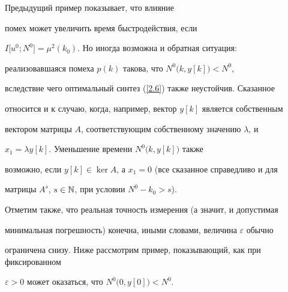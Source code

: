 \begin{notes}


Предыдущий пример показывает, что влияние


помех может увеличить время быстродействия, если


$I\bigl[u^0; N^0\bigr]=\mu^2(k_0)$. Но иногда возможна и обратная ситуация:


реализовавшаяся помеха $p(k)$ такова, что $N^0\bigl(k, y[k]\bigr)<N^0$,


вследствие чего оптимальный синтез (\ref{2.6}) также неустойчив. Сказанное


относится и к случаю, когда, например, вектор $y[k]$ является собственным


вектором матрицы $A$, соответствующим собственному значению $\lambda$, и


$x_1=\lambda y[k]$. Уменьшение времени $N^0\bigl(k, y[k]\bigr)$ также


возможно, если $y[k]\in\ker A$, а $x_1=0$ (все сказанное справедливо и для


матрицы $A^s$, $s\in\Bbb{N}$, при условии $N^0-k_0>s$).


\end{notes}





Отметим также, что реальная точность измерения (а значит, и допустимая


минимальная погрешность) конечна, иными словами, величина $\varepsilon$ обычно


ограничена снизу. Ниже рассмотрим пример, показывающий, как при фиксированном


$\varepsilon>0$ может оказаться, что $N^0\bigl(0, y[0]\bigr)<N^0$.





